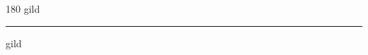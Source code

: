 
\begin{frame}
\begin{center}
\begin{turn}{180}
{\fontsize{2.5cm}{1em}\selectfont gild}
\end{turn}
\vspace{1em}\par  
\hrule
\vspace{1em}\par  
{\fontsize{2.5cm}{1em}\selectfont gild}
\end{center}
\end{frame}
